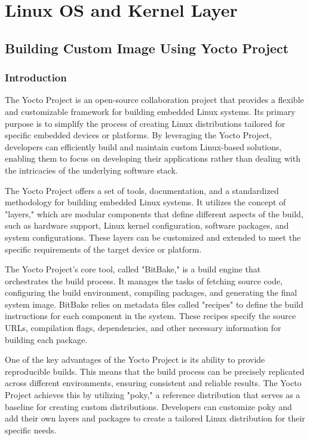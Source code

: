 \documentclass[
12pt,
oneside, 
onehalfspacing, 
nolistspacing, 
parskip, 
chapterinoneline, 
]{AASTCOMPUTER}
\begin{document}
\chapter{Linux OS and Kernel Layer}
\section{Building Custom Image Using Yocto Project}
\subsection{Introduction}
The Yocto Project is an open-source collaboration project that provides a flexible and customizable framework for building embedded Linux systems. Its primary purpose is to simplify the process of creating Linux distributions tailored for specific embedded devices or platforms. By leveraging the Yocto Project, developers can efficiently build and maintain custom Linux-based solutions, enabling them to focus on developing their applications rather than dealing with the intricacies of the underlying software stack.

The Yocto Project offers a set of tools, documentation, and a standardized methodology for building embedded Linux systems. It utilizes the concept of "layers," which are modular components that define different aspects of the build, such as hardware support, Linux kernel configuration, software packages, and system configurations. These layers can be customized and extended to meet the specific requirements of the target device or platform.

The Yocto Project's core tool, called "BitBake," is a build engine that orchestrates the build process. It manages the tasks of fetching source code, configuring the build environment, compiling packages, and generating the final system image. BitBake relies on metadata files called "recipes" to define the build instructions for each component in the system. These recipes specify the source URLs, compilation flags, dependencies, and other necessary information for building each package.

One of the key advantages of the Yocto Project is its ability to provide reproducible builds. This means that the build process can be precisely replicated across different environments, ensuring consistent and reliable results. The Yocto Project achieves this by utilizing "poky," a reference distribution that serves as a baseline for creating custom distributions. Developers can customize poky and add their own layers and packages to create a tailored Linux distribution for their specific needs.
\end{document}

